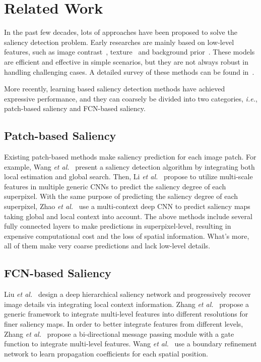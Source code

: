 \section{Related Work} In the past few decades, lots of approaches have been proposed to solve the saliency detection problem. Early researches are mainly based on low-level features, such as image contrast~\cite{itti1998model,cheng2015global}, texture~\cite{yan2013hierarchical,yang2013saliency} and background prior~\cite{li2013saliency,wei2012geodesic}. These models are efficient and effective in simple scenarios, but they are not always robust in handling challenging cases. A detailed survey of these methods can be found in~\cite{borji2015salient}.

More recently, learning based saliency detection methods have achieved expressive performance, and they can coarsely be divided into two categories, \emph{i.e.}, patch-based saliency and FCN-based saliency.
\subsection{Patch-based Saliency} Existing patch-based methods make saliency prediction for each image patch. For example, Wang \emph{et al.}~\cite{wang2015deep} present a saliency detection algorithm by integrating both local estimation and global search. Then, Li \emph{et al.}~\cite{li2015visual} propose to utilize multi-scale features in multiple generic CNNs to predict the saliency degree of each superpixel. With the same purpose of predicting the saliency degree of each superpixel, Zhao \emph{et al.}~\cite{zhao2015saliency} use a multi-context deep CNN to predict saliency maps taking global and local context into account. The above methods include several fully connected layers to make predictions in superpixel-level, resulting in expensive computational cost and the loss of spatial information. What's more, all of them make very coarse predictions and lack low-level details.
\subsection{FCN-based Saliency} Liu \emph{et al.}~\cite{liu2016dhsnet} design a deep hierarchical saliency network and progressively recover image details via integrating local context information. Zhang \emph{et al.}~\cite{zhang2017amulet} propose a generic framework to integrate multi-level features into different resolutions for finer saliency maps. In order to better integrate features from different levels, Zhang \emph{et al.}~\cite{zhang2018bi} propose a bi-directional message passing module with a gate function to integrate multi-level features. Wang \emph{et al.}~\cite{wang2018detect} use a boundary refinement network to learn propagation coefficients for each spatial position.


